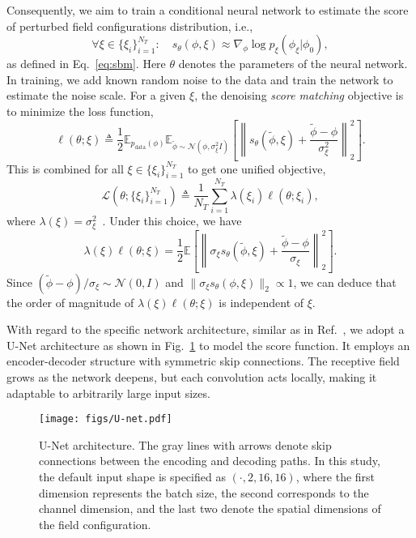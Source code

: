 \documentclass[a4paper,11pt]{article}
\begin{document}
Consequently, we aim to train a conditional neural network to estimate the score of perturbed field configurations distribution, i.e.,
\begin{equation}
\forall \xi \in \{ \xi_i \}_{i=1}^{N_T} : \quad s_{\theta}(\phi, \xi) \approx \nabla_\phi \log p_{\xi}(\phi_\xi  | \phi_0),
\end{equation}
as defined in Eq.~\eqref{eq:sbm}. Here $\theta$ denotes the parameters of the neural network. In training, we add known random noise to the data and train the network to estimate the noise scale. For a given $\xi$, the denoising \textit{score matching} objective is to minimize the loss function,
\begin{equation}
\ell(\theta; \xi) \triangleq \frac{1}{2} \mathbb{E}_{p_{\text{data}}(\phi)} \mathbb{E}_{\tilde{\phi} \sim \mathcal{N}(\phi, \sigma_\xi^2 I)} \left[ \left\lVert s_{\theta} (\tilde{\phi}, \xi) + \frac{\tilde{\phi} - \phi}{\sigma_\xi^2} \right\rVert_2^2 \right].
\end{equation}
This is combined for all $ \xi \in \{ \xi_i \}_{i=1}^{N_T} $ to get one unified objective,
\begin{equation}
\mathcal{L} (\theta; \{ \xi_i \}_{i=1}^{N_T}) \triangleq \frac{1}{N_T} \sum_{i=1}^{N_T} \lambda(\xi_i) \ell (\theta; \xi_i),
\end{equation}
where $ \lambda(\xi) = \sigma_\xi^2 $~\cite{song2020score}. Under this choice, we have
\begin{equation}
\lambda(\xi) \ell(\theta; \xi) = \frac{1}{2} \mathbb{E} \left[ \left\lVert \sigma_\xi s_{\theta}(\tilde{\phi}, \xi) + \frac{\tilde{\phi} - \phi}{\sigma_\xi} \right\rVert_2^2 \right].
\end{equation}
Since $(\tilde{\phi} - \phi)/\sigma_\xi \sim \mathcal{N}(0, I)$ and $\lVert \sigma_\xi s_{\theta}(\phi, \xi) \rVert_2 \propto 1 $, 
we can deduce that the order of magnitude of $ \lambda(\xi) \ell(\theta; \xi) $ is independent of $ \xi $. 

With regard to the specific network architecture, similar as in Ref.~\cite{Wang:2023exq}, we adopt a U-Net architecture as shown in Fig.~\ref{fig:unet} to model the score function. It employs an encoder-decoder structure with symmetric skip connections. The receptive field grows as the network deepens, but each convolution acts locally, making it adaptable to arbitrarily large input sizes.

\begin{figure}[h]
\begin{center}
\texttt{[image: figs/U-net.pdf]}
\caption{U-Net architecture. The gray lines with arrows denote skip connections between the encoding and decoding paths. In this study, the default input shape is specified as $(\cdot,2,16,16)$, where the first dimension represents the batch size, the second corresponds to the channel dimension, and the last two denote the spatial dimensions of the field configuration.}\label{fig:unet}
\end{center}

\end{figure}
\end{document}
